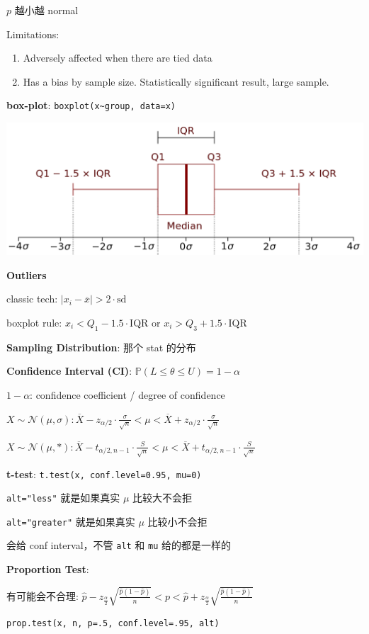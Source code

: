 \documentclass[9pt,landscape]{article}
\begin{document}
\begin{multicols}{3}
$p$ 越小越 normal

Limitations:
\begin{enumerate}
	\item Adversely affected when there are tied data
	\item Has a bias by sample size. Statistically significant result, large sample.
\end{enumerate}

\textbf{box-plot}: \texttt{boxplot(x\textasciitilde group, data=x)}

\includegraphics[width=0.7\columnwidth]{imgs/boxplot}

\textbf{Outliers}

classic tech: $|x_i-\overline{x}|>2\cdot\mathrm{sd}$

boxplot rule: $x_i<Q_1-1.5\cdot\mathrm{IQR}$ or $x_i > Q_3+1.5\cdot\mathrm{IQR}$

\textbf{Sampling Distribution}: 那个 stat 的分布

\textbf{Confidence Interval (CI)}: $\mathbb{P}(L\le \theta\le U)=1-\alpha$

$1-\alpha$: confidence coefficient / degree of confidence

$X\sim\mathcal{N}(\mu,\sigma): \overline{X}-z_{\alpha/2}\cdot\frac{\sigma}{\sqrt{n}}<\mu<\overline{X}+z_{\alpha/2}\cdot\frac{\sigma}{\sqrt{n}}$

$X\sim\mathcal{N}(\mu,*): \overline{X}-t_{\alpha/2,n-1}\cdot\frac{S}{\sqrt{n}}<\mu<\overline{X}+t_{\alpha/2,n-1}\cdot\frac{S}{\sqrt{n}}$

\textbf{t-test}: \texttt{t.test(x, conf.level=0.95, mu=0)}

\texttt{alt="less"} 就是如果真实 $\mu$ 比较大不会拒

\texttt{alt="greater"} 就是如果真实 $\mu$ 比较小不会拒

会给 conf interval，不管 \texttt{alt} 和 \texttt{mu} 给的都是一样的

\textbf{Proportion Test}:

有可能会不合理: $\hat{p}-z_{\frac{\alpha}{2}}\sqrt{\frac{\hat{p}(1-\hat{p})}{n}}<p<\hat{p}+z_{\frac{\alpha}{2}}\sqrt{\frac{\hat{p}(1-\hat{p})}{n}}$

\texttt{prop.test(x, n, p=.5, conf.level=.95, alt)}


\end{multicols}
\end{document}
